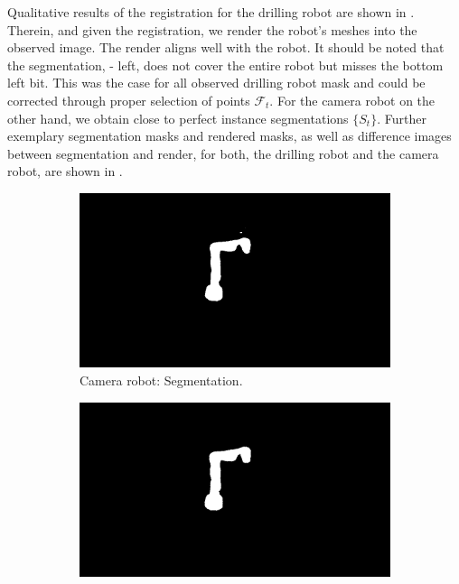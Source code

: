 Qualitative results of the registration for the drilling robot are shown in . Therein, and given the registration, we render the robot's meshes into the observed image. The render aligns well with the robot. It should be noted that the segmentation,  - left, does not cover the entire robot but misses the bottom left bit. This was the case for all observed drilling robot mask and could be corrected through proper selection of points $\mathcal{F}_t$. For the camera robot on the other hand, we obtain close to perfect instance segmentations $\{S_t\}$. Further exemplary segmentation masks and rendered masks, as well as difference images between segmentation and render, for both, the drilling robot and the camera robot, are shown in .
\begin{figure}[tb]
    \centering
    \begin{subfigure}[b]{0.32\textwidth}
        \includegraphics[width=\textwidth]{chapter_1/img/hsi_left_mask_2.png}
        \caption{Camera robot: Segmentation.}
    \end{subfigure}
    \begin{subfigure}[b]{0.32\textwidth}
        \includegraphics[width=\textwidth]{chapter_1/img/hsi_left_render_mask_2.png}

\end{subfigure}
\end{figure}
